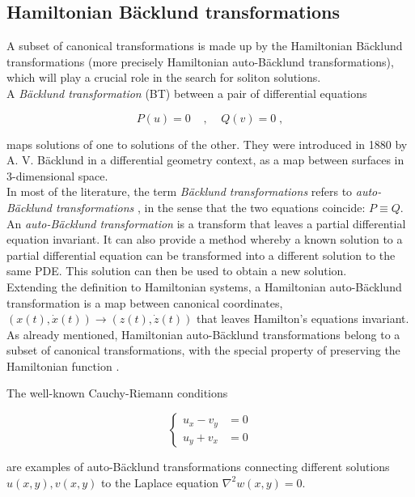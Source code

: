 \subsection{Hamiltonian Bäcklund transformations}
A subset of canonical transformations is made up by the Hamiltonian Bäcklund transformations (more precisely Hamiltonian auto-Bäcklund transformations), which will play a crucial role in the search for soliton solutions. \\
A \textit{Bäcklund transformation} (BT) between a pair of differential equations

\begin{equation}
    P(u) = 0\;\;\;\;,\;\;\;\;Q(v) = 0\;,
\end{equation}

maps solutions of one to solutions of the other. They were introduced in 1880 by A. V. Bäcklund \cite{backlund1880} in a differential geometry context, as a map between surfaces in 3-dimensional space. \\
In most of the literature, the term \textit{Bäcklund transformations} refers to \textit{auto-Bäcklund transformations} \cite{philip2019soliton}, in the sense that the two equations coincide: $P \equiv Q$.\\
An \textit{auto-Bäcklund transformation} is a transform that leaves a partial differential equation invariant. It can also provide a method whereby a known solution to a partial differential equation can be transformed into a different solution to the same PDE. This solution can then be used to obtain a new solution. \\
Extending the definition to Hamiltonian systems, a Hamiltonian auto-Bäcklund transformation is a map between canonical coordinates, $(x(t), \dot x(t)) \to (z(t), \dot z(t))$ that leaves Hamilton's equations invariant. 
As already mentioned, Hamiltonian auto-Bäcklund transformations belong to a subset of canonical transformations, with the special property of preserving the Hamiltonian function \cite{kuznetsov1998}.

\begin{example}
    The well-known Cauchy-Riemann conditions
    
    \begin{equation}
        \left \{ \begin{array}{cc}
        u_x - v_y &= 0 \\
        u_y + v_x &= 0
        \end{array}
        \right.
    \end{equation}
    
    are examples of auto-Bäcklund transformations connecting different solutions $u(x,y), v(x,y)$ to the Laplace equation $\nabla^2 w(x,y) = 0$.
\end{example}


